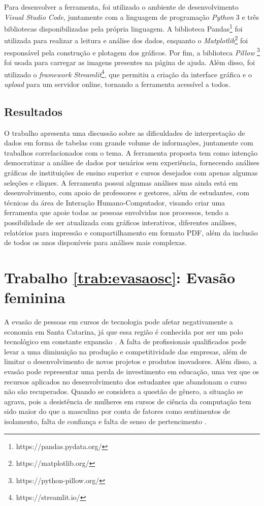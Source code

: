 \documentclass[12pt]{article}
\begin{document}
Para desenvolver a ferramenta, foi utilizado o ambiente de desenvolvimento  \textit{Visual Studio Code}, juntamente com a linguagem de programação  \textit{Python} 3 e três bibliotecas disponibilizadas pela própria linguagem. A biblioteca Pandas\footnote{https://pandas.pydata.org/} foi utilizada para realizar a leitura e análise dos dados, enquanto o \textit{Matplotlib}\footnote{https://matplotlib.org/} foi responsável pela construção e plotagem dos gráficos. Por fim, a biblioteca \textit{Pillow} \footnote{https://python-pillow.org/} foi usada para carregar as imagens presentes na página de ajuda. Além disso, foi utilizado o \textit{framework} \textit{Streamlit}\footnote{https://streamlit.io/}, que permitiu a criação da interface gráfica e o \textit{upload} para um servidor online, tornando a ferramenta acessível a todos.

\subsection{Resultados}

O trabalho apresenta uma discussão sobre as dificuldades de interpretação de dados em forma de tabelas com grande volume de informações, juntamente com trabalhos correlacionados com o tema. A ferramenta proposta tem como intenção democratizar a análise de dados por usuários sem experiência, fornecendo análises gráficas de instituições de ensino superior e cursos desejados com apenas algumas seleções e cliques. A ferramenta possui algumas análises mas ainda está em desenvolvimento, com apoio de professores e gestores, além de estudantes, com técnicas da área de Interação Humano-Computador, visando criar uma ferramenta que apoie todas as pessoas envolvidas nos processos, tendo a possibilidade de ser atualizada com gráficos interativos, diferentes análises, relatórios para impressão e compartilhamento em formato PDF, além da inclusão de todos os anos disponíveis para análises mais complexas.

\section{Trabalho \ref{trab:evasaosc}: Evasão feminina }
\label{sec:evasaosc}

A evasão de pessoas em cursos de tecnologia pode afetar negativamente a economia em Santa Catarina, já que essa região é conhecida por ser um polo tecnológico em constante expansão \cite{ACATE:2018}. A falta de profissionais qualificados pode levar a uma diminuição na produção e competitividade das empresas, além de limitar o desenvolvimento de novos projetos e produtos inovadores. Além disso, a evasão pode representar uma perda de investimento em educação, uma vez que os recursos aplicados no desenvolvimento dos estudantes que abandonam o curso não são recuperados. Quando se considera a questão de gênero, a situação se agrava, pois a desistência de mulheres em cursos de ciência da computação tem sido maior do que a masculina por conta de fatores como sentimentos de isolamento, falta de confiança e falta de senso de pertencimento \cite{patitsas2014historical}.
\end{document}
